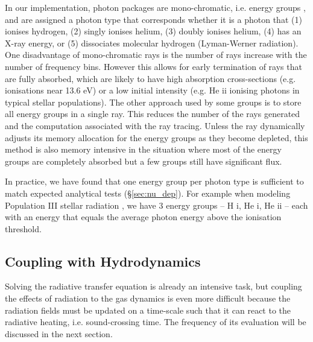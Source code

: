 \documentclass[useAMS,usenatbib]{mn2e}
\begin{document}
In our implementation, photon packages are mono-chromatic, i.e. energy
groups \citep[][Ch. 6]{Mihalas84}, and are assigned a photon type that
corresponds whether it is a photon that (1) ionises hydrogen, (2)
singly ionises helium, (3) doubly ionises helium, (4) has an X-ray
energy, or (5) dissociates molecular hydrogen (Lyman-Werner
radiation).  One disadvantage of mono-chromatic rays is the number of
rays increase with the number of frequency bins.  However this allows
for early termination of rays that are fully absorbed, which are
likely to have high absorption cross-sections (e.g. \hi ionisations
near 13.6 eV) or a low initial intensity (e.g. He {\sc ii} ionising
photons in typical stellar populations).  The other approach used by
some groups \citep[e.g.][]{Trac07} is to store all energy groups in a
single ray.  This reduces the number of the rays generated and the
computation associated with the ray tracing.  Unless the ray
dynamically adjusts its memory allocation for the energy groups as
they become depleted, this method is also memory intensive in the
situation where most of the energy groups are completely absorbed but
a few groups still have significant flux.

In practice, we have found that one energy group per photon type is
sufficient to match expected analytical tests (\S\ref{sec:nu_dep}).
For example when modeling Population III stellar radiation
\citep[e.g.][for hydrogen ionising radiation only]{Abel07,
  Wise08_Gal}, we have 3 energy groups -- H {\sc i}, He {\sc i}, He
{\sc ii} -- each with an energy that equals the average photon energy
above the ionisation threshold.

\subsection{Coupling with Hydrodynamics}
\label{sec:coupling}

Solving the radiative transfer equation is already an intensive task,
but coupling the effects of radiation to the gas dynamics is even more
difficult because the radiation fields must be updated on a time-scale
such that it can react to the radiative heating, i.e. sound-crossing
time.  The frequency of its evaluation will be discussed in the next
section.
\end{document}
